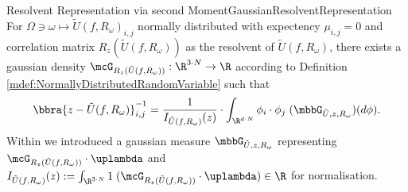 \begin{mpos}{Resolvent Representation via second Moment}{GaussianResolventRepresentation}
    For $\Omega\ni\omega\mapsto\tilde U(f,R_\omega)_{i,j}$ normally distributed with expectency $\mu_{i,j} = 0$ and correlation matrix $R_z(\tilde U(f,R_\omega))$ as the resolvent of $\tilde U(f,R_\omega)$, there exists a gaussian density $\mcG_{R_z(\tilde U(f,R_\omega))}:\R^{3\cdot N}\to\R$ according to Definition \ref{mdef:NormallyDistributedRandomVariable} such that
    \[
        \bbra{z - \tilde U(f,R_\omega)}^{-1}_{i,j} = \frac{1}{I_{\tilde U(f,R_\omega)}(z)}\cdot\int_{\R^{d\cdot N}}\phi_i\cdot\phi_j\;(\mbbG_{\tilde U,z,R_\omega})(d\phi).
    \]
    Within we introduced a gaussian measure $\mbbG_{\tilde U,z,R_\omega}$ representing $\mcG_{R_z(\tilde U(f,R_\omega))}\cdot\uplambda$ and $I_{\tilde U(f,R_\omega)}(z):=\int_{\R^{3\cdot N}}1\;(\mcG_{R_z(\tilde U(f,R_\omega))}\cdot\uplambda)\in\R$ for normalisation.
\end{mpos}